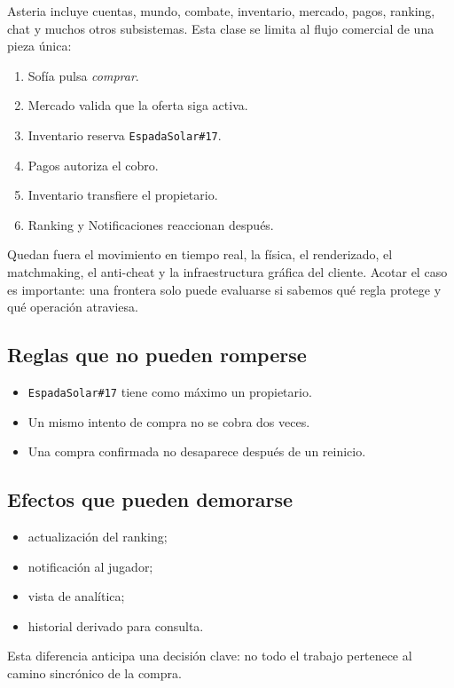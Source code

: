 \documentclass[variant=apuntes,cover=institutional,mode=screen]{ua-engineering-v6-article}
\begin{document}
Asteria incluye cuentas, mundo, combate, inventario, mercado, pagos, ranking, chat y muchos otros subsistemas. Esta clase se limita al flujo comercial de una pieza única:

\begin{enumerate}
\item Sofía pulsa \emph{comprar}.
\item Mercado valida que la oferta siga activa.
\item Inventario reserva \texttt{EspadaSolar\#17}.
\item Pagos autoriza el cobro.
\item Inventario transfiere el propietario.
\item Ranking y Notificaciones reaccionan después.
\end{enumerate}

Quedan fuera el movimiento en tiempo real, la física, el renderizado, el matchmaking, el anti-cheat y la infraestructura gráfica del cliente. Acotar el caso es importante: una frontera solo puede evaluarse si sabemos qué regla protege y qué operación atraviesa.

\subsection{Reglas que no pueden romperse}

\begin{itemize}
\item \texttt{EspadaSolar\#17} tiene como máximo un propietario.
\item Un mismo intento de compra no se cobra dos veces.
\item Una compra confirmada no desaparece después de un reinicio.
\end{itemize}

\subsection{Efectos que pueden demorarse}

\begin{itemize}
\item actualización del ranking;
\item notificación al jugador;
\item vista de analítica;
\item historial derivado para consulta.
\end{itemize}

Esta diferencia anticipa una decisión clave: no todo el trabajo pertenece al camino sincrónico de la compra.
\end{document}
